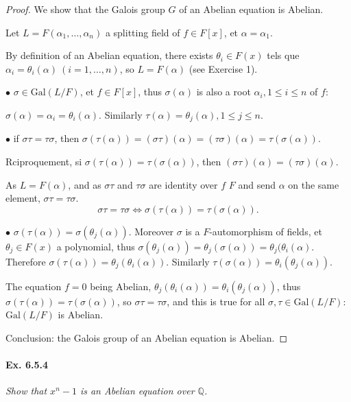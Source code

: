 \documentclass[11pt,a4paper]{article}
\newcommand{\Q}{\mathbb{Q}}
\newcommand{\Gal}{\mathrm{Gal}}
\begin{document}
\begin{proof}
We show that the Galois group $G$ of an Abelian equation is Abelian. 

Let $L=F(\alpha_1,\ldots,\alpha_n)$ a splitting field of $f \in F[x]$, et $\alpha=\alpha_1$.

By definition of an Abelian equation,  there exists $\theta_i \in F(x)$ tels que $\alpha_i = \theta_i(\alpha)\ (i=1,\ldots,n)$, so $L = F(\alpha)$ (see Exercise 1).

$\bullet$ 
$\sigma \in \Gal(L/F)$, et $f\in F[x]$, thus $\sigma(\alpha)$ is also a root $\alpha_i,1\leq i \leq n$ of $f$:

 $\sigma(\alpha) = \alpha_i = \theta_i(\alpha)$. Similarly $\tau(\alpha) = \theta_j(\alpha),1\leq j\leq n$.

$\bullet$ 
if $\sigma\tau = \tau \sigma$, then $\sigma( \tau (\alpha)) = (\sigma \tau)(\alpha) = (\tau \sigma)(\alpha) = \tau(\sigma(\alpha))$.

Rciproquement, si $\sigma( \tau (\alpha))  = \tau(\sigma(\alpha))$, then $(\sigma \tau)(\alpha) = (\tau \sigma)(\alpha)$.

As $L = F(\alpha)$, and as  $\sigma \tau$ and $\tau \sigma$ are identity over $f$ $F$ and send $\alpha$ on the same element, $\sigma\tau = \tau \sigma$.
$$\sigma \tau = \tau \sigma \iff \sigma( \tau (\alpha))  = \tau(\sigma(\alpha)).$$

$\bullet$ $\sigma(\tau(\alpha)) = \sigma(\theta_j(\alpha))$.
Moreover $\sigma$ is a $F$-automorphism of fields, et $\theta_j \in F(x)$ a polynomial, thus $\sigma(\theta_j(\alpha)) = \theta_j(\sigma(\alpha)) = \theta_j(\theta_i(\alpha)$. Therefore 
$\sigma(\tau(\alpha)) = \theta_j(\theta_i(\alpha))$. Similarly $\tau(\sigma(\alpha)) = \theta_i(\theta_j(\alpha))$.

The equation $f=0$ being Abelian, $\theta_j(\theta_i(\alpha)) = \theta_i(\theta_j(\alpha))$, thus $\sigma(\tau(\alpha)) = \tau(\sigma(\alpha))$, so $\sigma \tau=\tau \sigma$, and this is true for all  $\sigma,\tau \in \Gal(L/F)$: $\Gal(L/F)$ is Abelian.

Conclusion: the Galois group of an Abelian equation is Abelian. 
\end{proof}

\paragraph{Ex. 6.5.4}

{\it Show that $x^n-1$ is an Abelian equation over $\Q$.
}
\end{document}
